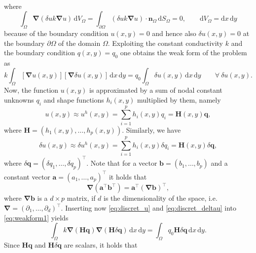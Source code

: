 \documentclass[a4paper,11pt]{article}
\numberwithin{equation}{section}
\newcommand\vect[1]{\ensuremath{\bm{#1}}}
\begin{document}
{\begin{align}
\end{align} where \begin{equation}
	\int_\Omega \vect{\nabla}\left(\delta u k\vect{\nabla}u\right)\, \mathrm{d}V_\Omega =\int_{\partial \Omega} (\delta u k\vect{\nabla}u) \cdot \vect{n}_\Omega \,\mathrm{d}S_\Omega = 0, \qquad \mathrm{d}V_\Omega = \mathrm{d}x\,\mathrm{d}y
\end{equation} because of the boundary condition $u(x,y) = 0$ and hence also $\delta u(x,y) = 0$ at the boundary $\partial \Omega$ of the domain $\Omega$. Exploiting the constant conductivity $k$ and the boundary condition $q(x,y) = q_0$ one obtains the weak form of the problem as \begin{equation}\label{eq:weakform1}
	k\int_{\Omega} \left[\vect{\nabla}u(x,y)\right]\left[\vect{\nabla}\delta u(x,y)\right]\,\mathrm{d}x\,\mathrm{d}y = q_0\int_\Omega \delta u(x,y)\,\mathrm{d}x\,\mathrm{d}y \qquad \forall \ \delta u(x,y).
\end{equation} Now, the function $u(x,y)$ is approximated by a sum of nodal constant unknowns $q_i$ and shape functions $h_i(x,y)$ multiplied by them, namely \begin{equation}\label{eq:discret_u}
	u(x,y) \approx u^h(x,y) = \sum_{i=1}^{p}h_i(x,y)q_i = \vect{H}(x,y)\vect{q},
\end{equation} where $\vect{H} = (h_1(x,y),\dots,h_p(x,y))$. Similarly, we have \begin{equation}\label{eq:discret_deltau}
	\delta u(x,y) \approx \delta u^h(x,y) = \sum_{i=1}^{p}h_i(x,y)\delta q_i = \vect{H}(x,y)\delta \vect{q},
\end{equation} where $\delta \vect{q} = (\delta q_1,\dots,\delta q_p)^\top$. Note that for a vector $\vect{b} = (b_1,\dots,b_p)$ and a constant vector $\vect{a} = (a_1,\dots,a_p)^\top$ it holds that \begin{equation}
	\vect{\nabla}(\vect{a}^\top \vect{b}^\top) = \vect{a}^\top (\vect{\nabla}\vect{b})^\top,
\end{equation} where $\vect{\nabla}\vect{b}$ is a $d \times p$ matrix, if $d$ is the dimensionality of the space, i.e. $\vect{\nabla} = (\partial_1,\dots,\partial_d)^\top$. Inserting now \cref{eq:discret_u} and \cref{eq:discret_deltau} into \cref{eq:weakform1} yields \begin{equation}
	\int_{\Omega} k\vect{\nabla}\left(\vect{H}\vect{q}\right)\vect{\nabla}\left(\vect{H} \delta \vect{q}\right)\,\mathrm{d}x\,\mathrm{d}y = \int_\Omega q_0 \vect{H}\delta \vect{q}\,\mathrm{d}x\,\mathrm{d}y.
\end{equation} Since $\vect{H}\vect{q}$ and $\vect{H}\delta \vect{q}$ are scalars, it holds that \begin{equation}

\end{equation}}
\end{document}
